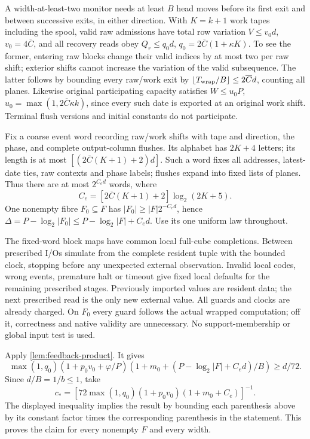 \begin{informalproof}
A width-at-least-two monitor needs at least $B$ head moves before its first
exit and between successive exits, in either direction. With $K=k+1$
work tapes including the spool, valid raw admissions have total row variation
$V\le v_0d$, $v_0=4\overline C$, and all recovery reads obey
$Q_r\le q_0d$, $q_0=2\overline C(1+\kappa K)$. To see the former,
entering raw blocks change their valid indices by at most two per raw shift;
exterior shifts cannot increase the variation of the valid subsequence.
The latter follows by bounding every raw/work exit by
$\lfloor T_{\rm wrap}/B\rfloor\le2\overline C d$, counting all planes.
Likewise original participating capacity satisfies
$W\le u_0P$, $u_0=\max(1,2\overline C\kappa k)$, since every such
date is exported at an original work shift. Terminal flush versions and
initial constants do not participate.

Fix a coarse event word recording raw/work shifts with tape and direction,
the phase, and complete output-column flushes. Its alphabet has $2K+4$
letters; its length is at most
$[(2\overline C(K+1)+2)d]$. Such a word fixes all addresses, latest-date
ties, raw contexts and phase labels; flushes expand into fixed lists of
planes. Thus there are at most $2^{C_ed}$ words, where
\[
 C_e=[2\overline C(K+1)+2]\log_2(2K+5).
\]
One nonempty fibre $F_0\subseteq F$ has
$|F_0|\ge|F|2^{-C_ed}$, hence
$\Delta=P-\log_2|F_0|\le P-\log_2|F|+C_ed$.
Use its one uniform law throughout.

The fixed-word block maps have common local full-cube completions. Between
prescribed I/Os simulate from the complete resident tuple with the bounded
clock, stopping before any unexpected external observation. Invalid local
codes, wrong events, premature halt or timeout give fixed local defaults
for the remaining prescribed stages. Previously imported values are
resident data; the next prescribed read is the only new external value.
All guards and clocks are already charged. On $F_0$ every guard follows
the actual wrapped computation; off it, correctness and native validity
are unnecessary. No support-membership or global input test is used.

Apply \cref{lem:feedback-product}. It gives
\[
 \max(1,q_0)(1+p_0v_0+\varphi/P)
 (1+m_0+(P-\log_2|F|+C_ed)/B)\ge d/72.
\]
Since $d/B=1/b\le1$, take
\[
 c_*=[72\max(1,q_0)(1+p_0v_0)(1+m_0+C_e)]^{-1}.
\]
The displayed inequality implies the result by bounding each parenthesis
above by its constant factor times the corresponding parenthesis in the
statement. This proves the claim for every nonempty $F$ and every width.
\end{informalproof}

